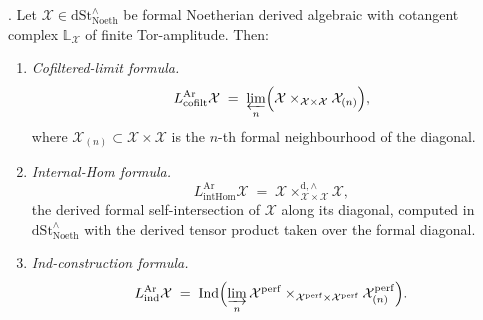 \begin{proposition}
\label{v4-arith:bzn-rcompletion:prop:R3-three-computations}
\ClaimStatusConjectured. Let \(\mathcal{X}\in\mathrm{dSt}^{\wedge}_{\mathrm{Noeth}}\)
be formal Noetherian derived algebraic with cotangent complex
\(\mathbb{L}_{\mathcal{X}}\) of finite Tor-amplitude. Then:
\begin{enumerate}
\item \emph{Cofiltered-limit formula.}
\begin{equation}
L^{\mathrm{Ar}}_{\mathrm{cofilt}}\mathcal{X}
\;=\;\varprojlim_{n}\Bigl(\mathcal{X}\times_{\mathcal{X}\times\mathcal{X}}\mathcal{X}_{(n)}\Bigr),
\end{equation}
where \(\mathcal{X}_{(n)}\subset\mathcal{X}\times\mathcal{X}\) is the
\(n\)-th formal neighbourhood of the diagonal.
\item \emph{Internal-Hom formula.}
\begin{equation}
L^{\mathrm{Ar}}_{\mathrm{intHom}}\mathcal{X}
\;=\;\mathcal{X}\times_{\mathcal{X}\times\mathcal{X}}^{\mathrm{d},\wedge}\mathcal{X},
\end{equation}
the derived formal self-intersection of \(\mathcal{X}\) along its
diagonal, computed in \(\mathrm{dSt}^{\wedge}_{\mathrm{Noeth}}\)
with the derived tensor product taken over the formal diagonal.
\item \emph{Ind-construction formula.}
\begin{equation}
L^{\mathrm{Ar}}_{\mathrm{ind}}\mathcal{X}
\;=\;\mathrm{Ind}\Bigl(\varinjlim_{n}\mathcal{X}^{\mathrm{perf}}\times_{\mathcal{X}^{\mathrm{perf}}\times\mathcal{X}^{\mathrm{perf}}}\mathcal{X}^{\mathrm{perf}}_{(n)}\Bigr).
\end{equation}
\end{enumerate}
\end{proposition}


